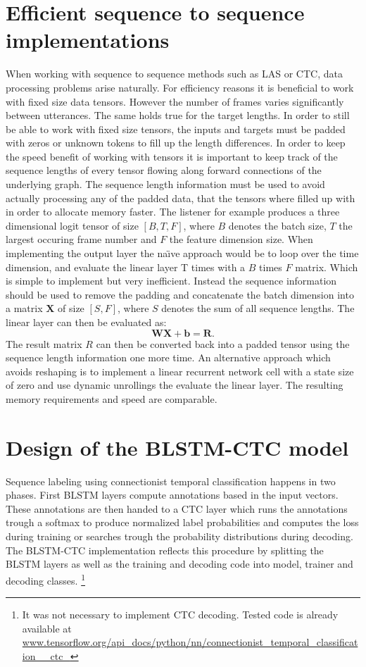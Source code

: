 \section{Efficient sequence to sequence implementations}
When working with sequence to sequence methods such as LAS or CTC, data processing problems arise naturally. For efficiency reasons it is beneficial to work with fixed size data tensors. However the number of frames varies significantly between utterances. The same holds true for the target lengths. In order to still be able to work with fixed size tensors, the inputs and targets must be padded with zeros or unknown tokens to fill up the length differences.
In order to keep the speed benefit of working with tensors it is important to
keep track of the sequence lengths of every tensor flowing along forward connections of the underlying graph.
The sequence length information must be used to avoid actually processing any of the padded data, that the tensors where filled up with in order to allocate memory faster.
The listener for example produces a three dimensional logit tensor of size $[B, T, F]$, where $B$ denotes the batch size, $T$ the largest occuring frame number and $F$ the feature dimension size. When implementing the output layer the na\"{\i}ve approach would be to loop over the time dimension, and evaluate the linear layer T times with a $B$ times $F$ matrix. Which is simple to implement but very inefficient. Instead the sequence information should be used to remove the padding and concatenate the batch dimension into a matrix $\mathbf{X}$ of size $[S, F]$, where $S$ denotes the sum of all sequence lengths. The linear layer can then be evaluated as:
\begin{equation}
\mathbf{W}\mathbf{X} + \mathbf{b} = \mathbf{R}.
\end{equation}
The result matrix $R$ can then be converted back into a padded tensor using the sequence length information one more time.
An alternative approach which avoids reshaping is to implement a linear recurrent network cell with a state size of zero and use dynamic unrollings the evaluate the linear layer. The resulting memory requirements and speed are comparable.

\section{Design of the BLSTM-CTC model}
Sequence labeling using connectionist temporal classification happens in two phases. First BLSTM layers compute annotations based in the input vectors. These annotations are then handed to a CTC layer which runs the annotations trough a softmax to produce normalized label probabilities and computes the loss during training or searches trough the probability distributions during decoding. 
The BLSTM-CTC implementation reflects this procedure by splitting the BLSTM layers as well as the training and decoding code into model, trainer and decoding classes. \footnote{It was not necessary to implement CTC decoding. Tested code is already available at \url{www.tensorflow.org/api_docs/python/nn/connectionist\_temporal\_classification\_\_ctc\_}} 



